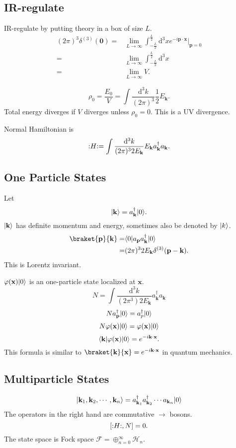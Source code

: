 \subsection{IR-regulate}
IR-regulate by  putting theory in a box of size $L$.
\begin{align*}
  (2\pi)^3\delta^{(3)}(\mathbf{0})=&\lim_{L \to \infty} \int_{-\frac{L}{2}}^{\frac{L}{2}}\mathrm{d}^{3}xe^{-i\mathbf{p}\cdot \mathbf{x}}\bigg\lvert_{\mathbf{p}=0}\\
  =& \lim_{L \to \infty} \int_{-\frac{L}{2}}^{\frac{L}{2}}\mathrm{d}^3x\\
  =& \lim_{L \to \infty} V
.\end{align*}

\[
  \rho_0=\frac{E_0}{V}=\int \frac{\mathrm{d}^3k}{(2\pi)^3}\frac{1}{2}E_{\mathbf{k}}
.\]
Total energy  diverges if $V$ diverges unless $\rho_0=0$. This is a UV divergence.

Normal Hamiltonian is 
\[
  :\mathrel{H}:=\int \frac{\mathrm{d}^3k}{(2\pi)^32E_{\mathbf{k}}}E_{\mathbf{k}}a_{\mathbf{k}}^{\dagger}a_{\mathbf{k}}
.\] 

\subsection{One Particle States}
Let
\[
  \lvert\mathbf{k}\rangle=a_{\mathbf{k}}^{\dagger}\lvert0\rangle
.\] 
$\lvert\mathbf{k}\rangle$ has definite momentum and energy, sometimes also be denoted by $\lvert k\rangle$.
\begin{align*}
  \braket{\mathbf{p}}{\mathbf{k}}=&\bra{0}a_{\mathbf{p}}a_{\mathbf{k}}^{\dagger}\ket{0}\\
  =& (2\pi)^32E_{\mathbf{k}}\delta^{(3)}(\mathbf{p}-\mathbf{k})
.\end{align*}
This is Lorentz invariant.

$\varphi(\mathbf{x})\lvert0\rangle$ is an one-particle state localized at $\mathbf{x}$.
\[
  N=\int \frac{\mathrm{d}^3k}{(2\pi^3)2E_{\mathbf{k}}}a_{\mathbf{k}}^{\dagger}a_{\mathbf{k}}
\] 
\[
Na_{\mathbf{p}}^{\dagger}\lvert0\rangle=a_{p}^{\dagger}\lvert0\rangle
\] 
\[
  N\varphi(\mathbf{x})\lvert0\rangle=\varphi(\mathbf{x})\lvert0\rangle
\] 
\[
  \langle\mathbf{k}\rvert\varphi(\mathbf{x})\lvert0\rangle=e^{-i\mathbf{k}\cdot \mathbf{x}}
.\] 
This formula is similar to $\braket{\mathbf{k}}{\mathbf{x}}=e^{-i\mathbf{k}\cdot \mathbf{x}}$ in quantum mechanics.
\subsection{Multiparticle States}
\[
\lvert\mathbf{k}_1,\mathbf{k}_2,\cdots,\mathbf{k}_n \rangle=a_{\mathbf{k}_1}^{\dagger}a_{\mathbf{k}_2}^{\dagger}\cdots a_{\mathbf{k}_n}\lvert0\rangle 
\] 
The operators in the right hand are commutative $\to $ bosons.
\[
\left[ :\mathrel{H}:,N \right] =0
.\] 
The state space is Fock space $\mathcal{F}=\oplus_{n=0}^{\infty}\mathcal{H}_n$.
